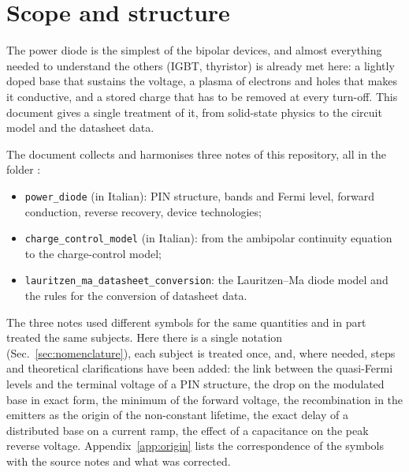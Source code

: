 \documentclass[10pt,a4paper]{scrartcl}
\begin{document}

\tableofcontents
\newpage

\section{Scope and structure}
\label{sec:scope}
The power diode is the simplest of the bipolar devices, and almost everything needed to understand the others (IGBT, thyristor) is already met here: a lightly doped base that sustains the voltage, a plasma of electrons and holes that makes it conductive, and a stored charge that has to be removed at every turn-off. This document gives a single treatment of it, from solid-state physics to the circuit model and the datasheet data.

The document collects and harmonises three notes of this repository, all in the folder {\def\UrlBreaks{\do\/\do\_}}:
\begin{itemize}
\item \texttt{power\_diode} (in Italian): PIN structure, bands and Fermi level, forward conduction, reverse recovery, device technologies;
\item \texttt{charge\_control\_model} (in Italian): from the ambipolar continuity equation to the charge-control model;
\item \texttt{lauritzen\_ma\_datasheet\_conversion}: the Lauritzen--Ma diode model and the rules for the conversion of datasheet data.
\end{itemize}
The three notes used different symbols for the same quantities and in part treated the same subjects. Here there is a single notation (Sec.~\ref{sec:nomenclature}), each subject is treated once, and, where needed, steps and theoretical clarifications have been added: the link between the quasi-Fermi levels and the terminal voltage of a PIN structure, the drop on the modulated base in exact form, the minimum of the forward voltage, the recombination in the emitters as the origin of the non-constant lifetime, the exact delay of a distributed base on a current ramp, the effect of a capacitance on the peak reverse voltage. Appendix~\ref{app:origin} lists the correspondence of the symbols with the source notes and what was corrected.
\end{document}
